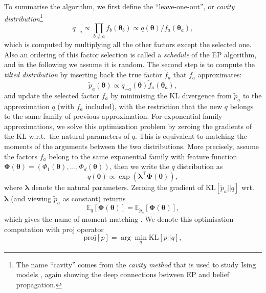 %
To summarise the algorithm, we first define the ``leave-one-out'', or \emph{cavity distribution}\footnote{The name ``cavity'' comes from the \emph{cavity method} that is used to study Ising models \citep{mezard:spin1987}, again showing the deep connections between EP and belief propagation.}
\begin{equation}
q_{-a} \propto \prod_{b \neq a} f_b(\bm{\theta}_b) \propto q(\bm{\theta}) / f_a(\bm{\theta}_a),  
\end{equation}
which is computed by multiplying all the other factors except the selected one. Also an ordering of this factor selection is called a \emph{schedule} of the EP algorithm, and in the following we assume it is random. The second step is to compute the \emph{tilted distribution} by inserting back the true factor $\tilde{f}_a$ that $f_a$ approximates:
\begin{equation}
\tilde{p}_{a}(\bm{\theta}) \propto q_{-a}(\bm{\theta}) \tilde{f}_a(\bm{\theta}_a),
\end{equation}
and update the selected factor $f_a$ by minimising the KL divergence from $\tilde{p}_{a}$ to the approximation $q$ (with $f_a$ included), with the restriction that the new $q$ belongs to the same family of previous approximation. For exponential family approximations, we solve this optimisation problem by zeroing the gradients of the KL w.r.t.~the natural parameters of $q$. This is equivalent to matching the moments of the arguments between the two distributions. More precisely, assume the factors $f_a$ belong to the same exponential family with feature function $\bm{\Phi}(\bm{\theta}) = (\Phi_1(\bm{\theta}), ..., \Phi_d(\bm{\theta}))$, then we write the $q$ distribution as
\begin{equation}
q(\bm{\theta}) \propto \exp(\bm{\lambda}^{\text{T}} \bm{\Phi}(\bm{\theta})),
\label{eq:chap2_ep_expfam_param}
\end{equation}
where $\bm{\lambda}$ denote the natural parameters. Zeroing the gradient of $\mathrm{KL}[\tilde{p}_{a} || q]$ wrt.~$\bm{\lambda}$ (and viewing $\tilde{p}_{a}$ as constant) returns
\begin{equation}
\mathbb{E}_{q} \left[ \bm{\Phi}(\bm{\theta}) \right] = \mathbb{E}_{\tilde{p}_{a}} \left[ \bm{\Phi}(\bm{\theta}) \right],
\label{eq:chap2_ep_moment_matching}
\end{equation}
%
which gives the name of moment matching \citep{seeger:ep2005}. We denote this optimisation computation with $\mathrm{proj}$ operator
\begin{equation}
\mathrm{proj}[p] = \arg\min_{q} \mathrm{KL}[p|| q],
\end{equation}

